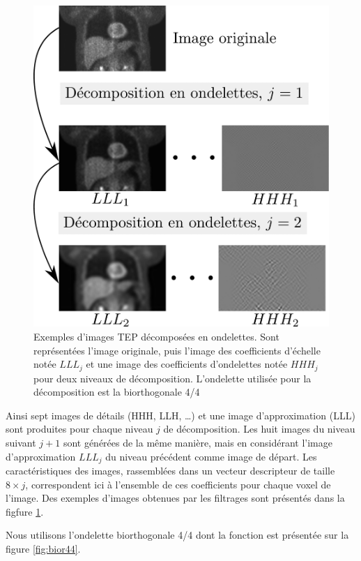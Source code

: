 \begin{figure}
 \centering
 \includegraphics[width=15cm]{images/exemplesDecomp}
 \caption[Exemples de décomposition d'images en ondelettes]{Exemples d'images TEP décomposées en ondelettes. Sont représentées l'image originale, puis l'image des coefficients d'échelle notée $LLL_j$ et une image des coefficients d'ondelettes notée $HHH_j$ pour deux niveaux de décomposition. L'ondelette utilisée pour la décomposition est la biorthogonale 4/4}
 \label{fig:bior44Ex}
\end{figure}


Ainsi sept images de détails (HHH, LLH, \dots) et une image d’approximation (LLL) sont produites pour chaque niveau $j$ de décomposition. Les huit images du niveau suivant $j+1$ sont générées de la même manière, mais en considérant l’image d’approximation $LLL_j$ du niveau précédent comme image de départ. Les caractéristiques des images, rassemblées dans un vecteur descripteur de taille $8 \times j$, correspondent ici à l’ensemble de ces coefficients pour chaque voxel  de l’image. Des exemples d'images obtenues par les filtrages sont présentés dans la figfure \ref{fig:bior44Ex}.

Nous utilisons l'ondelette biorthogonale 4/4 dont la fonction est présentée sur la figure \ref{fig:bior44}.


